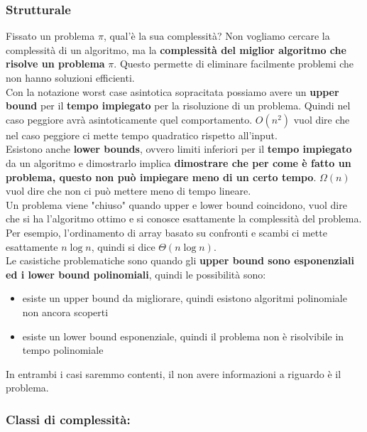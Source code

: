 \newpage

\subsubsection{Strutturale}

Fissato un problema $\pi$, qual'è la sua complessità? Non vogliamo cercare la complessità di un algoritmo, ma la \textbf{complessità del miglior algoritmo che risolve un problema} $\pi$. Questo permette di eliminare facilmente problemi che non hanno soluzioni efficienti.\\

Con la notazione worst case asintotica sopracitata possiamo avere un \textbf{upper bound} per il \textbf{tempo impiegato} per la risoluzione di un problema. Quindi nel caso peggiore avrà asintoticamente quel comportamento. $O(n^2)$ vuol dire che nel caso peggiore ci mette tempo quadratico rispetto all'input.\\

Esistono anche \textbf{lower bounds}, ovvero limiti inferiori per il \textbf{tempo impiegato} da un algoritmo e dimostrarlo implica \textbf{dimostrare che per come è fatto un problema, questo non può impiegare meno di un certo tempo}. $\Omega(n)$ vuol dire che non ci può mettere meno di tempo lineare.\\

Un problema viene "chiuso" quando upper e lower bound coincidono, vuol dire che si ha l'algoritmo ottimo e si conosce esattamente la complessità del problema. Per esempio, l'ordinamento di array basato su confronti e scambi ci mette esattamente $n \log n$, quindi si dice $\Theta(n \log n)$.\\

Le casistiche problematiche sono quando gli \textbf{upper bound sono esponenziali ed i lower bound polinomiali}, quindi le possibilità sono: 
\begin{itemize}
	\item esiste un upper bound da migliorare, quindi esistono algoritmi polinomiale non ancora scoperti
	\item esiste un lower bound esponenziale, quindi il problema non è risolvibile in tempo polinomiale
\end{itemize}

In entrambi i casi saremmo contenti, il non avere informazioni a riguardo è il problema.\\

\newpage

\subsubsection{Classi di complessità:} 

